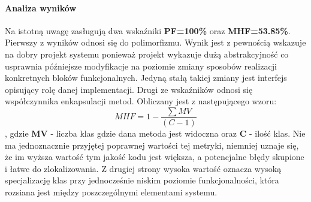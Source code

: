 	\paragraph{Analiza wyników}
	Na istotną uwagę zasługują dwa wskaźniki \textbf{PF=100\%{}} oraz \textbf{MHF=53.85\%{}}.
	Pierwszy z wyników odnosi się do polimorfizmu. Wynik jest z pewnością wskazuje na dobry 
	projekt systemu ponieważ projekt wykazuje dużą abstrakcyjność co usprawnia późniejsze modyfikacje
	na poziomie zmiany sposobów realizacji konkretnych bloków funkcjonalnych. Jedyną stałą takiej
	zmiany jest interfejs opisujący rolę danej implementacji. 
	Drugi ze wskaźników odnosi się współczynnika enkapsulacji metod. Obliczany jest z następującego wzoru:
	\[ MHF = 1 - \frac{\sum{MV}}{(C-1)} \], gdzie \textbf{MV} - liczba klas gdzie 
	dana metoda jest widoczna oraz \textbf{C} - ilość klas. Nie ma jednoznacznie przyjętej
	poprawnej wartości tej metryki, niemniej uznaje się, że im wyższa wartość tym jakość kodu jest większa,
	a potencjalne błędy skupione i łatwe do zlokalizowania. Z drugiej strony wysoka wartość oznacza wysoką
	specjalizację klas przy jednocześnie niskim poziomie funkcjonalności, która rozsiana jest między 
	poszczególnymi elementami systemu. 